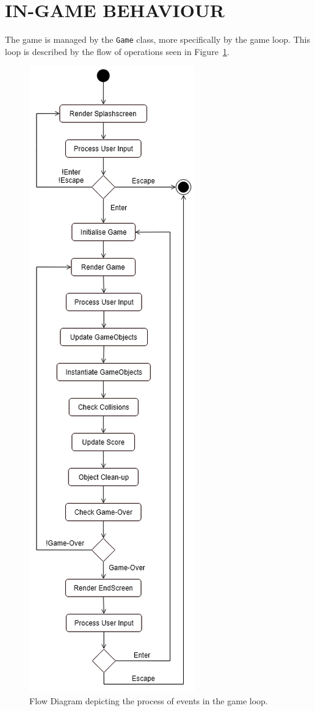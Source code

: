 \documentclass[10pt,twocolumn]{witseiepaper}
\begin{document}
\section{IN-GAME BEHAVIOUR}

The game is managed by the \texttt{Game} class, more specifically by the game loop. This loop is described by the flow of operations seen in Figure~\ref{fig:flowDiagram}. 

\begin{figure}[h]
	\centering
	\includegraphics[width=\textwidth,height=0.9\textheight,keepaspectratio]{flowdiagram.png}
	\caption{Flow Diagram depicting the process of events in the game loop.}
	\raggedright
	\label{fig:flowDiagram}
\end{figure}
\end{document}
